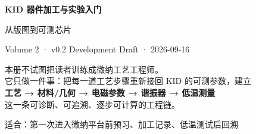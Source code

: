 


\begin{titlepage}
\centering
\vspace*{2.0cm}
{\fontsize{30}{38}\selectfont\bfseries\color{KidDark} KID 器件加工与实验入门}\par
\vspace{0.5cm}
{\Large\color{KidBlue} 从版图到可测芯片}\par
\vspace{1.0cm}
{\large Volume 2 · v0.2 Development Draft · 2026-09-16}\par
\vfill
\begin{tcolorbox}[width=0.9\textwidth,colback=KidGray,colframe=KidBlue!55,arc=3mm]
\centering\large
本册不试图把读者训练成微纳工艺工程师。\\[0.4em]
它只做一件事：把每一道工艺步骤重新接回 KID 的可测参数，建立\\[0.4em]
\textbf{工艺 → 材料/几何 → 电磁参数 → 谐振器 → 低温测量}\\[0.4em]
这一条可诊断、可追溯、逐步可计算的工程链。
\end{tcolorbox}
\vfill
{\large 适合：第一次进入微纳平台前预习、加工记录、低温测试后回溯}\par
\end{titlepage}

\setcounter{tocdepth}{1}
\tableofcontents
\clearpage















